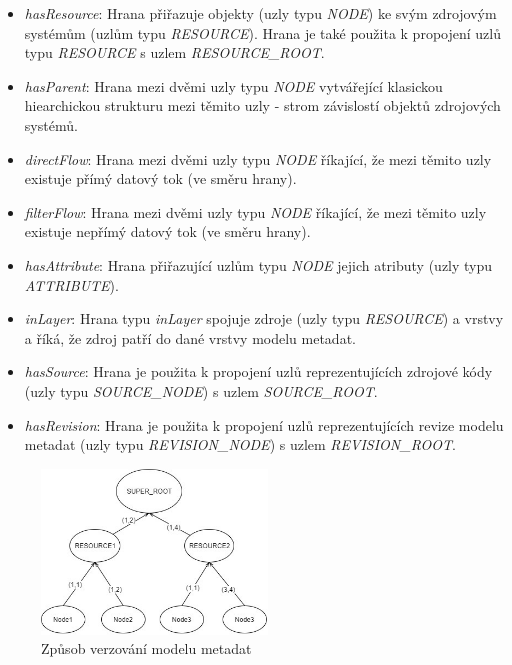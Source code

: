  \begin{itemize}
	\item{\textit{hasResource}}: Hrana přiřazuje objekty (uzly typu \textit{NODE}) ke svým zdrojovým systémům (uzlům typu \textit{RESOURCE}). Hrana je také použita k propojení uzlů typu \textit{RESOURCE} s uzlem \textit{RESOURCE\_ROOT}.
	\item{\textit{hasParent}}: Hrana mezi dvěmi uzly typu \textit{NODE} vytvářející klasickou hiearchickou strukturu mezi těmito uzly - strom závislostí objektů zdrojových systémů.
	\item{\textit{directFlow}}: Hrana mezi dvěmi uzly typu \textit{NODE} říkající, že mezi těmito uzly existuje přímý datový tok (ve směru hrany).
	\item{\textit{filterFlow}}: Hrana mezi dvěmi uzly typu \textit{NODE} říkající, že mezi těmito uzly existuje nepřímý datový tok (ve směru hrany).
	\item{\textit{hasAttribute}}: Hrana přiřazující uzlům typu \textit{NODE} jejich atributy (uzly typu \textit{ATTRIBUTE}).
	\item{\textit{inLayer}}: Hrana typu \textit{inLayer} spojuje zdroje (uzly typu \textit{RESOURCE}) a vrstvy a říká, že zdroj patří do dané vrstvy modelu metadat.
	\item{\textit{hasSource}}: Hrana je použita k propojení uzlů reprezentujících zdrojové kódy (uzly typu \textit{SOURCE\_NODE}) s uzlem \textit{SOURCE\_ROOT}.
	\item{\textit{hasRevision}}: Hrana je použita k propojení uzlů reprezentujících revize modelu metadat (uzly typu \textit{REVISION\_NODE}) s uzlem \textit{REVISION\_ROOT}.
\end{itemize}

\begin{figure}
\begin{center}
\includegraphics[width=6cm]{figures/model_revisions}
\caption{Způsob verzování modelu metadat}
\label{fig:ana-model-rev}
\end{center}
\end{figure}

